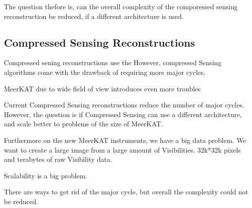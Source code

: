 The question thefore is, can the overall complexity of the comporessed sensing reconstruction be reduced, if a different architecture is used.


\subsection{Compressed Sensing Reconstructions}
Compressed sening reconstructions use the 
 However, compressed Sensing algorithms come with the drawback of requiring more major cycles.

MeerKAT due to wide field of view introduces even more troubles

Current Compressed Sensing reconstructions reduce the number of major cycles. However, the question is if Compressed Sensing can use a different architecture, and scale better to problems of the size of MeerKAT.

Furthermore on the new MeerKAT instruments, we have a big data problem. We want to create a large image from a large amount of Visibilities. 32k*32k pixels and terabytes of raw Visibility data. 

Scalability is a big problem.

There are ways to get rid of the major cycle, but overall the complexity could not be reduced.









